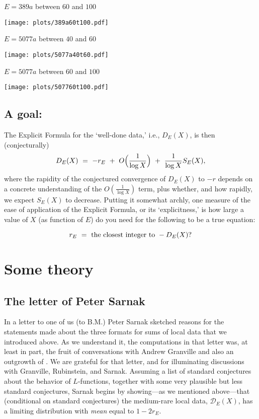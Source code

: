 \documentclass[11pt]{article}
\theoremstyle{plain}
\theoremstyle{definition}
\numberwithin{equation}{section}
\numberwithin{figure}{section}
\numberwithin{table}{section}
\begin{document}
   \centerline{ $E = 389a$  between $60$ and $100$}
   \vskip10pt
 \hskip100pt \texttt{[image: plots/389a60t100.pdf]}
\newpage
  \centerline{ $E = 5077a$  between $40$ and $60$}
   \vskip10pt
 \hskip100pt \texttt{[image: plots/5077a40t60.pdf]}

   \centerline{ $E = 5077a$  between $60$ and $100$}
   \vskip10pt
 \hskip100pt \texttt{[image: plots/507760t100.pdf]}


  \subsection{ A goal:}  The  Explicit Formula for the `well-done data,' i.e., ${D}_E(X)$,  is then (conjecturally)
   $${D}_E(X)\ = \ -r_E \ +\ O\Bigl( {\frac{1}{\log X}}\Bigr)\  +\  {\frac{1}{\log X}}S_E(X),$$
   where the rapidity of the conjectured convergence of ${D}_E(X)$ to $-r$ depends on a concrete understanding of the $O( {\frac{1}{\log X}})$ term, plus whether, and how rapidly, we expect  $S_E(X)$ to decrease. Putting it somewhat archly, one measure of the ease of application of  the Explicit Formula, or its `explicitness,' is how large a value of $X$ (as function of $E$) do  you need for the following to be a true equation:

   $$r_E \ = \ {\rm the\ closest\ integer\ to \ }- {D}_E(X)?$$


   \vskip40pt
\section{ Some  theory}
  \vskip30pt


    \subsection{The letter of Peter Sarnak}  In a letter  \cite{S}  to one of us (to B.M.) Peter Sarnak sketched reasons for the statements made about the three formats for sums of local data that we  introduced above. As we  understand it, the computations in that letter was, at least in part, the fruit of conversations with Andrew Granville and also an outgrowth of \cite{R-S}. We are grateful for that letter, and for  illuminating discussions with    Granville, Rubinstein, and Sarnak.  Assuming a list of standard conjectures about the behavior of $L$-functions, together with some very plausible but less standard conjectures, Sarnak begins by showing---as we mentioned above---that (conditional on standard conjectures) the medium-rare local data,  ${\mathcal D}_E(X)$, has a limiting distribution with {\it mean} equal to $1- 2r_E$.
\end{document}
